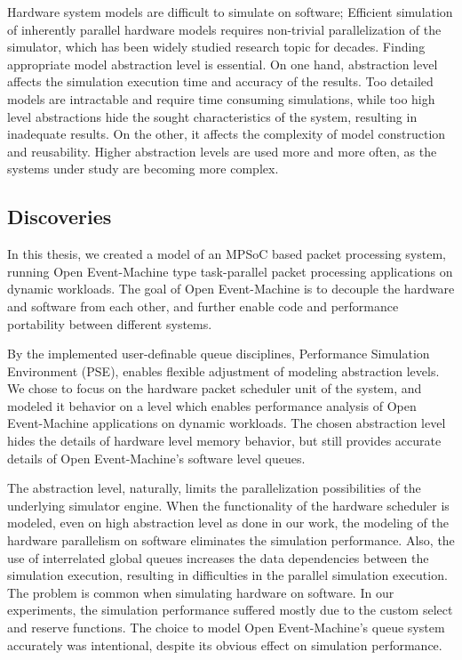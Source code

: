Hardware system models are difficult to simulate on software; Efficient simulation of inherently parallel hardware models requires non-trivial parallelization of the simulator, which has been widely studied research topic for decades. Finding appropriate model abstraction level is essential. On one hand, abstraction level affects the simulation execution time and accuracy of the results. Too detailed models are intractable and require time consuming simulations, while too high level abstractions hide the sought characteristics of the system, resulting in inadequate results. On the other, it affects the complexity of model
construction and reusability. Higher abstraction levels are used more and more often, as the systems under study are becoming more complex.

\subsection{Discoveries}
In this thesis, we created a model of an MPSoC based packet processing system, running Open Event-Machine type task-parallel packet processing applications on dynamic workloads. The goal of Open Event-Machine is to decouple the hardware and software from each other, and further enable code and performance portability between different systems.

By the implemented user-definable queue disciplines, Performance Simulation Environment (PSE), enables flexible adjustment of modeling abstraction levels. We chose to focus on the hardware packet scheduler unit of the system, and modeled it behavior on a level which enables performance analysis of Open Event-Machine applications on dynamic workloads. The chosen abstraction level hides the details of hardware level memory behavior, but still provides accurate details of Open Event-Machine's software level queues.

The abstraction level, naturally, limits the parallelization possibilities of the underlying simulator engine. When the functionality of the hardware scheduler is modeled, even on high abstraction level as done in our work, the modeling of the hardware parallelism on software eliminates the simulation performance. Also, the use of interrelated global queues increases the data dependencies between the simulation execution, resulting in difficulties in the parallel simulation execution. The problem is common when simulating hardware on software. In our experiments, the simulation performance suffered mostly due to the custom select and reserve functions. The choice to model Open Event-Machine's queue system accurately was intentional, despite its obvious effect on simulation performance.

